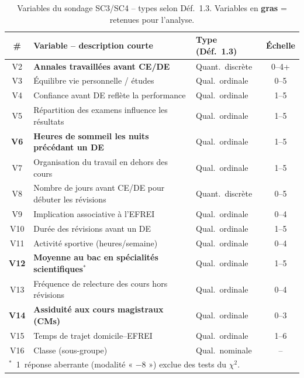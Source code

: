 \begin{table}[H]
\centering\footnotesize
\begin{tabularx}{\linewidth}{c X l c}
\toprule
\textbf{\#} & \textbf{Variable – description courte} & \textbf{Type (Déf.~1.3)} & \textbf{Échelle} \\
\midrule
V2  & \textbf{Annales travaillées avant CE/DE}               & Quant.\ discrète & 0–4+  \\
V3  & Équilibre vie personnelle / études                    & Qual.\ ordinale  & 0–5   \\
V4  & Confiance avant DE reflète la performance             & Qual.\ ordinale  & 1–5   \\
V5  & Répartition des examens influence les résultats       & Qual.\ ordinale  & 1–5   \\
\textbf{V6}  & \textbf{Heures de sommeil les nuits précédant un DE}   & Qual.\ ordinale  & 1–5   \\
V7  & Organisation du travail en dehors des cours           & Qual.\ ordinale  & 1–5   \\
V8  & Nombre de jours avant CE/DE pour débuter les révisions & Quant.\ discrète & 0–5   \\
V9  & Implication associative à l'EFREI                     & Qual.\ ordinale  & 0–4   \\
V10 & Durée des révisions avant un DE                       & Qual.\ ordinale  & 1–5   \\
V11 & Activité sportive (heures/semaine)                    & Qual.\ ordinale  & 0–4   \\
\textbf{V12} & \textbf{Moyenne au bac en spécialités scientifiques}$^*$   & Qual.\ ordinale  & 1–5   \\
V13 & Fréquence de relecture des cours hors révisions       & Qual.\ ordinale  & 0–4   \\
\textbf{V14} & \textbf{Assiduité aux cours magistraux (CMs)}          & Qual.\ ordinale  & 0–3   \\
V15 & Temps de trajet domicile–EFREI                        & Qual.\ ordinale  & 1–6   \\
V16 & Classe (sous-groupe)                                  & Qual.\ nominale  & –     \\
\bottomrule
\multicolumn{4}{l}{$^*$~1~réponse aberrante (modalité « $-8$ ») exclue des tests du $\chi^2$.}
\end{tabularx}
\caption{Variables du sondage SC3/SC4 – types selon Déf.~1.3. Variables en \textbf{gras} = retenues pour l'analyse.}
\end{table}

